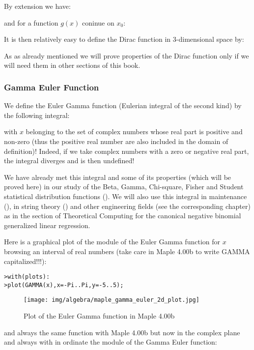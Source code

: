 	By extension we have:
	
	and for a function $g (x)$ coninue on $x_0$:
	
	It is then relatively easy to define the Dirac function in 3-dimensional space by:
	
	As as already mentioned we will prove properties of the Dirac function only if we will need them in other sections of this book.
	
	\subsubsection{Gamma Euler Function}
	We define the Euler Gamma function (Eulerian integral of the second kind) by the following integral:
	
	with $x$ belonging to the set of complex numbers whose real part is positive and non-zero (thus the positive real number are also included in the domain of definition)! Indeed, if we take complex numbers with a zero or negative real part, the integral diverges and is then undefined!
	
	\begin{tcolorbox}[title=Remark,colframe=black,arc=10pt]
		We have already met this integral and some of its properties (which will be proved here) in our study of the Beta, Gamma, Chi-square, Fisher and Student statistical distribution functions (). We will also use this integral in maintenance (), in string theory () and other engineering fields (see the corresponding chapter) as in the section of Theoretical Computing for the canonical negative binomial generalized linear regression.
	\end{tcolorbox}
	
	Here is a graphical plot of the module of the Euler Gamma function for $x$ browsing an interval of real numbers (take care in Maple 4.00b to write GAMMA capitalized!!!):
	
	\texttt{>with(plots):\\}
	\texttt{>plot(GAMMA(x),x=-Pi..Pi,y=-5..5);}
	\begin{figure}[H]
		\centering
		\texttt{[image: img/algebra/maple\_gamma\_euler\_2d\_plot.jpg]}
		\caption{Plot of the Euler Gamma function in Maple 4.00b}
	\end{figure}
	and always the same function with Maple 4.00b but now in the complex plane and always with in ordinate the module of the Gamma Euler function:
	
